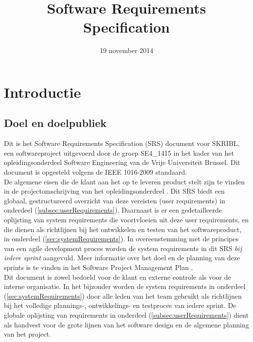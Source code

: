 \documentclass{article}
\title{Software Requirements Specification}
\author{} %
\date{19 november 2014} %
\begin{document}




\tableofcontents
\newpage


\section{Introductie}

\subsection{Doel en doelpubliek} %
Dit is het Software Requirements Specification (SRS) document voor SKRIBL,  een softwareproject uitgevoerd door de groep SE4\_1415 in het kader van het opleidingsonderdeel Software Engineering van de Vrije Universiteit Brussel. Dit document is opgesteld volgens de IEEE 1016-2009 standaard. \newline
\\
\noindent De algemene eisen die de klant aan het op te leveren product stelt zijn te vinden in de projectomschrijving van het opleidingsonderdeel \cite{Xtreport:organisatie}. Dit SRS biedt een globaal, gestructureerd overzicht van deze vereisten (user requirements) in onderdeel (\ref{subsec:userRequirements}). Daarnaast is er een gedetailleerde oplijsting van system requirements die voortvloeien uit deze user requirements, en die dienen als richtlijnen bij het ontwikkelen en testen van het softwareproduct, in onderdeel (\ref{sec:systemRequirements}). In overeenstemming met de principes van een agile development proces worden de system requirements in dit SRS \emph{bij iedere sprint} aangevuld. Meer informatie over het doel en de planning van deze sprints is te vinden in het Software Project Management Plan \cite{Xtreport:SPMP}. \newline
\\
\noindent Dit document is zowel bedoeld voor de klant en externe controle als voor de interne organisatie. In het bijzonder worden de system requirements in onderdeel (\ref{sec:systemRequirements}) door alle leden van het team gebruikt als richtlijnen bij het volledige plannings-, ontwikkelings- en testproces van iedere sprint. De globale oplijsting van requirements in onderdeel (\ref{subsec:userRequirements}) dient als handvest voor de grote lijnen van het software design en de algemene planning van het project.  
\end{document}
